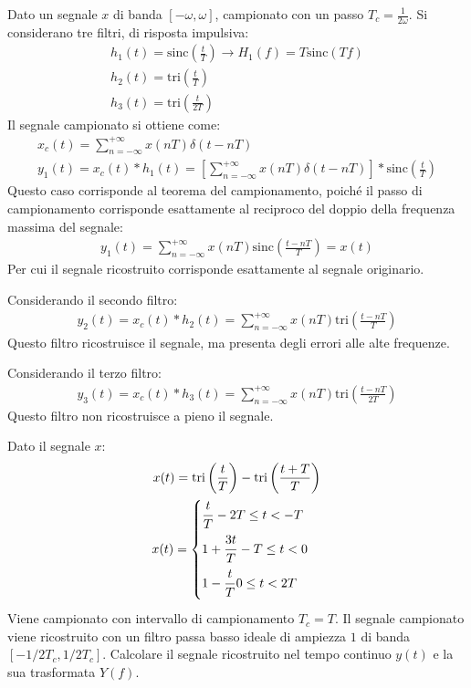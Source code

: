 \documentclass{article}
\newcommand{\sinc}{\mbox{sinc}}
\begin{document}
Dato un segnale $x$ di banda $[-\omega,\omega]$, campionato con un passo $T_c=\displaystyle\frac{1}{2\omega}$. Si considerano tre filtri, di risposta impulsiva:
\begin{gather*}
    h_1(t)=\sinc\left(\displaystyle\frac{t}{T}\right)\to H_1(f)=T\sinc(Tf)\\
    h_2(t)=\mbox{tri}\left(\displaystyle\frac{t}{T}\right)\\
    h_3(t)=\mbox{tri}\left(\displaystyle\frac{t}{2T}\right)
\end{gather*}
Il segnale campionato si ottiene come:
\begin{gather*}
    x_c(t)=\displaystyle\sum_{n=-\infty}^{+\infty}x(nT)\delta(t-nT)\\
    y_1(t)=x_c(t)*h_1(t)=\left[\displaystyle\sum_{n=-\infty}^{+\infty}x(nT)\delta(t-nT)\right]*\sinc\left(\frac{t}{T}\right)
\end{gather*}
Questo caso corrisponde al teorema del campionamento, poiché il passo di campionamento corrisponde esattamente al reciproco del doppio della frequenza massima del segnale:
\begin{gather}
    y_1(t)=\displaystyle\sum_{n=-\infty}^{+\infty}x(nT)\sinc\left(\frac{t-nT}{T}\right)=x(t)
\end{gather}
Per cui il segnale ricostruito corrisponde esattamente al segnale originario. 

Considerando il secondo filtro:
\begin{gather}
    y_2(t)=x_c(t)*h_2(t)=\displaystyle\sum_{n=-\infty}^{+\infty}x(nT)\mbox{tri}\left(\frac{t-nT}{T}\right)
\end{gather}
Questo filtro ricostruisce il segnale, ma presenta degli errori alle alte frequenze. 

Considerando il terzo filtro:
\begin{gather}
    y_3(t)=x_c(t)*h_3(t)=\displaystyle\sum_{n=-\infty}^{+\infty}x(nT)\mbox{tri}\left(\frac{t-nT}{2T}\right)
\end{gather}
Questo filtro non ricostruisce a pieno il segnale. 


Dato il segnale $x$:
\begin{gather*}
    x(t)=\mbox{tri}\left(\displaystyle\frac{t}{T}\right)-\mbox{tri}\left(\frac{t+T}{T}\right)\\
    x(t)=\begin{cases}
        \displaystyle\frac{\strut t}{\strut T} -2T\leq t<-T\\
        1+\displaystyle\frac{\strut 3t}{\strut T} -T\leq t<0\\
        1-\displaystyle\frac{\strut t}{\strut T} 0\leq t<2T
    \end{cases}
\end{gather*}
Viene campionato con intervallo di campionamento $T_c=T$. Il segnale campionato viene ricostruito con un filtro passa basso ideale di ampiezza $1$ di banda $[-1/2T_c,1/2T_c]$. 
Calcolare il segnale ricostruito nel tempo continuo $y(t)$ e la sua trasformata $Y(f)$. 
\end{document}
